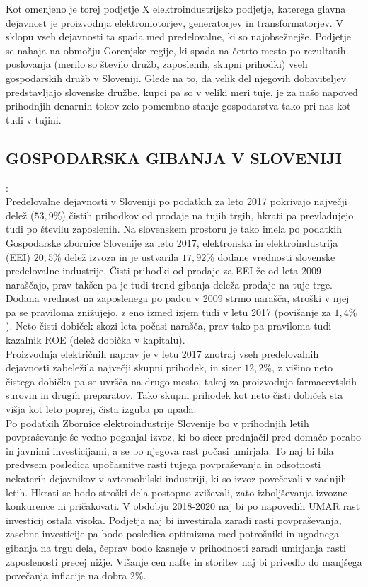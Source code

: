\documentclass[12pt,a4paper]{amsart}
\theoremstyle{definition} %
\theoremstyle{plain} %
\begin{document}
Kot omenjeno je torej podjetje X elektroindustrijsko podjetje, katerega glavna dejavnost je proizvodnja elektromotorjev, generatorjev in transformatorjev. V sklopu vseh dejavnosti ta spada med predelovalne, ki so najobsežnejše. Podjetje se nahaja na območju Gorenjske regije, ki spada na četrto mesto po rezultatih poslovanja (merilo so število družb, zaposlenih, skupni prihodki) vseh gospodarskih družb v Sloveniji. Glede na to, da velik del njegovih dobaviteljev predstavljajo slovenske družbe, kupci pa so v veliki meri tuje, je za našo napoved prihodnjih denarnih tokov zelo pomembno stanje gospodarstva tako pri nas kot tudi v tujini.

\subsection{GOSPODARSKA GIBANJA V SLOVENIJI}:\\

Predelovalne dejavnosti v Sloveniji po podatkih za leto 2017 pokrivajo največji delež ($53,9\%$) čistih prihodkov od prodaje na tujih trgih, hkrati pa prevladujejo tudi po številu zaposlenih. 
Na slovenskem prostoru je tako imela po podatkih Gospodarske zbornice Slovenije za leto 2017, elektronska in elektroindustrija (EEI) $20,5\%$ delež izvoza in je ustvarila $17,92\%$ dodane vrednosti slovenske predelovalne industrije. Čisti prihodki od prodaje za EEI že od leta 2009 naraščajo, prav takšen pa je tudi trend gibanja deleža prodaje na tuje trge. Dodana vrednost na zaposlenega po padcu v 2009 strmo narašča, stroški v njej pa se praviloma znižujejo, z eno izmed izjem tudi v letu 2017 (povišanje za $1,4\%$). Neto čisti dobiček skozi leta počasi narašča, prav tako pa praviloma tudi kazalnik ROE (delež dobička v kapitalu).\\
Proizvodnja električnih naprav je v letu 2017 znotraj vseh predelovalnih dejavnosti zabeležila največji skupni prihodek, in sicer $12,2\%$, z višino neto čistega dobička pa se uvršča na drugo mesto, takoj za proizvodnjo farmacevtskih surovin in drugih preparatov. Tako skupni prihodek kot neto čisti dobiček sta višja kot leto poprej, čista izguba pa upada.\\

Po podatkih Zbornice elektroindustrije Slovenije bo v prihodnjih letih povpraševanje še vedno poganjal izvoz, ki bo sicer prednjačil pred domačo porabo in javnimi investicijami, a se bo njegova rast počasi umirjala. To naj bi bila predvsem posledica upočasnitve rasti tujega povpraševanja in odsotnosti nekaterih dejavnikov v avtomobilski industriji, ki so izvoz povečevali v zadnjih letih. Hkrati se bodo stroški dela postopno zviševali, zato izboljševanja izvozne konkurence ni pričakovati. V obdobju 2018-2020 naj bi po napovedih UMAR rast investicij ostala visoka. Podjetja naj bi investirala zaradi rasti povpraševanja, zasebne investicije pa bodo posledica optimizma med potrošniki in ugodnega gibanja na trgu dela, čeprav bodo kasneje v prihodnosti zaradi umirjanja rasti zaposlenosti precej nižje. Višanje cen nafte in storitev naj bi privedlo do manjšega povečanja inflacije na dobra $2\%$.
\end{document}
